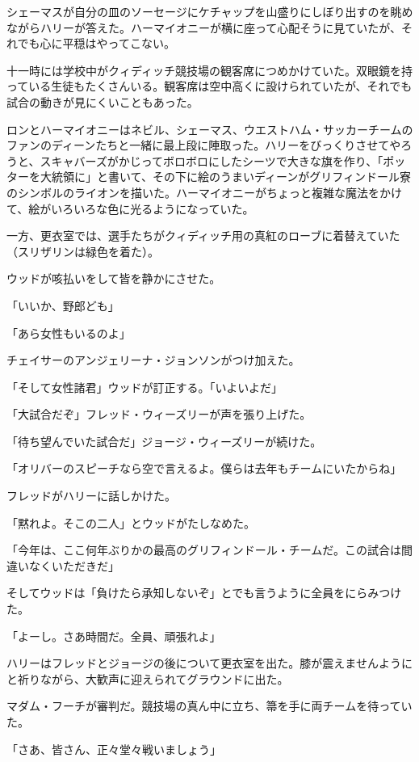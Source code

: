 \documentclass[10pt,a4paper]{article}
\begin{document}
\begin{CJK}{UTF8}{min}
シェーマスが自分の皿のソーセージにケチャップを山盛りにしぼり出すのを眺めながらハリーが答えた。ハーマイオニーが横に座って心配そうに見ていたが、それでも心に平穏はやってこない。



十一時には学校中がクィディッチ競技場の観客席につめかけていた。双眼鏡を持っている生徒もたくさんいる。観客席は空中高くに設けられていたが、それでも試合の動きが見にくいこともあった。

ロンとハーマイオニーはネビル、シェーマス、ウエストハム・サッカーチームのファンのディーンたちと一緒に最上段に陣取った。ハリーをびっくりさせてやろうと、スキャバーズがかじってボロボロにしたシーツで大きな旗を作り、「ポッターを大統領に」と書いて、その下に絵のうまいディーンがグリフィンドール寮のシンボルのライオンを描いた。ハーマイオニーがちょっと複雑な魔法をかけて、絵がいろいろな色に光るようになっていた。

一方、更衣室では、選手たちがクィディッチ用の真紅のローブに着替えていた（スリザリンは緑色を着た）。

ウッドが咳払いをして皆を静かにさせた。

「いいか、野郎ども」

「あら女性もいるのよ」

チェイサーのアンジェリーナ・ジョンソンがつけ加えた。

「そして女性諸君」ウッドが訂正する。「いよいよだ」

「大試合だぞ」フレッド・ウィーズリーが声を張り上げた。

「待ち望んでいた試合だ」ジョージ・ウィーズリーが続けた。

「オリバーのスピーチなら空で言えるよ。僕らは去年もチームにいたからね」

フレッドがハリーに話しかけた。

「黙れよ。そこの二人」とウッドがたしなめた。

「今年は、ここ何年ぶりかの最高のグリフィンドール・チームだ。この試合は間違いなくいただきだ」

そしてウッドは「負けたら承知しないぞ」とでも言うように全員をにらみつけた。

「よーし。さあ時間だ。全員、頑張れよ」

ハリーはフレッドとジョージの後について更衣室を出た。膝が震えませんようにと祈りながら、大歓声に迎えられてグラウンドに出た。

マダム・フーチが審判だ。競技場の真ん中に立ち、箒を手に両チームを待っていた。

「さあ、皆さん、正々堂々戦いましょう」


\end{CJK}
\end{document}
